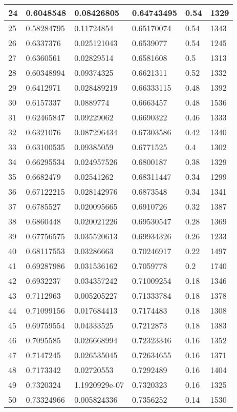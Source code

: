 \begin{longtable}{|l|l|l|l|l|l|}
24 & 0.6048548 & 0.08426805 & 0.64743495 & 0.54 & 1329 \\ \hline 
25 & 0.58284795 & 0.11724854 & 0.65170074 & 0.54 & 1343 \\ \hline 
26 & 0.6337376 & 0.025121043 & 0.6539077 & 0.54 & 1245 \\ \hline 
27 & 0.6360561 & 0.02829514 & 0.6581608 & 0.5 & 1313 \\ \hline 
28 & 0.60348994 & 0.09374325 & 0.6621311 & 0.52 & 1332 \\ \hline 
29 & 0.6412971 & 0.028489219 & 0.66333115 & 0.48 & 1392 \\ \hline 
30 & 0.6157337 & 0.0889774 & 0.6663457 & 0.48 & 1536 \\ \hline 
31 & 0.62465847 & 0.09229062 & 0.6690322 & 0.46 & 1333 \\ \hline 
32 & 0.6321076 & 0.087296434 & 0.67303586 & 0.42 & 1340 \\ \hline 
33 & 0.63100535 & 0.09385059 & 0.6771525 & 0.4 & 1302 \\ \hline 
34 & 0.66295534 & 0.024957526 & 0.6800187 & 0.38 & 1329 \\ \hline 
35 & 0.6682479 & 0.02541262 & 0.68311447 & 0.34 & 1299 \\ \hline 
36 & 0.67122215 & 0.028142976 & 0.6873548 & 0.34 & 1341 \\ \hline 
37 & 0.6785527 & 0.020095665 & 0.6910726 & 0.32 & 1387 \\ \hline 
38 & 0.6860448 & 0.020021226 & 0.69530547 & 0.28 & 1369 \\ \hline 
39 & 0.67756575 & 0.035520613 & 0.69934326 & 0.26 & 1233 \\ \hline 
40 & 0.68117553 & 0.03286663 & 0.70246917 & 0.22 & 1497 \\ \hline 
41 & 0.69287986 & 0.031536162 & 0.7059778 & 0.2 & 1740 \\ \hline 
42 & 0.6932237 & 0.034357242 & 0.71009254 & 0.18 & 1346 \\ \hline 
43 & 0.7112963 & 0.005205227 & 0.71333784 & 0.18 & 1378 \\ \hline 
44 & 0.71099156 & 0.017684413 & 0.7174483 & 0.18 & 1308 \\ \hline 
45 & 0.69759554 & 0.04333525 & 0.7212873 & 0.18 & 1383 \\ \hline 
46 & 0.7095585 & 0.026668994 & 0.72323346 & 0.16 & 1352 \\ \hline 
47 & 0.7147245 & 0.026535045 & 0.72634655 & 0.16 & 1371 \\ \hline 
48 & 0.7173342 & 0.02720553 & 0.7292489 & 0.16 & 1404 \\ \hline 
49 & 0.7320324 & 1.1920929e-07 & 0.7320323 & 0.16 & 1325 \\ \hline 
50 & 0.73324966 & 0.005824336 & 0.7356252 & 0.14 & 1530 \\ \hline 
\end{longtable}